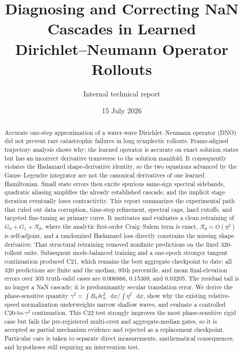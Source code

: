 \documentclass[11pt]{article}
\title{Diagnosing and Correcting NaN Cascades in Learned\\
Dirichlet--Neumann Operator Rollouts}
\author{Internal technical report}
\date{15 July 2026}
\newcommand{\R}{\mathcal{R}_{\theta}}
\newcommand{\dd}{\mathop{}\!\mathrm{d}}
\begin{document}
\maketitle
\tableofcontents
\newpage

\begin{abstract}
Accurate one-step approximation of a water-wave Dirichlet--Neumann operator
(DNO) did not prevent rare catastrophic failures in long symplectic rollouts.
Frame-aligned trajectory analysis shows why: the learned operator is accurate
on exact solution states but has an incorrect derivative transverse to the
solution manifold.  It consequently violates the Hadamard shape-derivative
identity, so the two equations advanced by the Gauss--Legendre integrator are
not the canonical derivatives of one learned Hamiltonian.  Small state errors
then excite spurious same-sign spectral sidebands, quadratic aliasing amplifies
the already established cascade, and the implicit stage iteration eventually
loses contractivity.  This report summarizes the experimental path that ruled
out data corruption, time-step refinement, spectral caps, hard cutoffs, and
targeted fine-tuning as primary cures.  It motivates and evaluates a clean
retraining of \(G_0+G_1+\R\), where the analytic first-order Craig--Sulem term
is exact, \(\R=O(\eta^2)\) is self-adjoint, and a randomized Hadamard loss
directly constrains the missing shape derivative.  That structural retraining
removed nonfinite predictions on the fixed 320-rollout suite.  Subsequent
mode-balanced training and a one-epoch stronger tangent continuation produced
C21, which remains the best aggregate checkpoint to date: all 320 predictions are finite and
the median, 95th percentile, and mean final-elevation errors over 305
truth-valid cases are 0.006866, 0.15369, and 0.03205.  The residual tail is no
longer a NaN cascade; it is predominantly secular translation error.  We
derive the phase-sensitive quantity
\(\gamma^2=\int B_h\delta c_h^2\,\dd x/\int\eta^2\,\dd x\), show why the existing
relative-speed normalization underweights narrow shallow waves, and evaluate a
controlled C20-to-\(\gamma^2\) continuation.  This C22 test strongly improves
the most phase-sensitive rigid case but fails the pre-registered multi-crest
and aggregate-median gates, so it is accepted as partial mechanism evidence and
rejected as a replacement checkpoint.  Particular care is taken to separate
direct measurements, mathematical consequences, and hypotheses still
requiring an intervention test.
\end{abstract}
\end{document}
